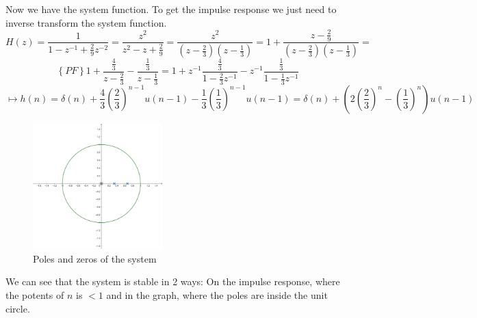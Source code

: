 \documentclass{article}
\begin{document}
\begin{enumerate}
\begin{enumerate}
                Now we have the system function. To get the impulse response we just need to inverse transform the system function.
                $$
                    H(z) = \frac{1}{1 - z^{-1} + \frac{2}{9}z^{-2}} = 
                    \frac{z^2}{z^2 - z + \frac{2}{9}} = 
                    \frac{z^2}{ (z-\frac{2}{3}) (z-\frac{1}{3}) } = 
                    1 + \frac{z-\frac{2}{9}}{ (z-\frac{2}{3}) (z-\frac{1}{3}) } =
                $$ $$
                    \left\{ PF \right\} 
                    1 + \frac{\frac{4}{3}}{z-\frac{2}{3}} - \frac{\frac{1}{3}}{z-\frac{1}{3}} = 
                    1 + z^{-1}\frac{\frac{4}{3}}{1-\frac{2}{3}z^{-1}}
                    - z^{-1}\frac{\frac{1}{3}}{1-\frac{1}{3}z^{-1}} 
                $$ $$
                    \longmapsto h(n) = \delta(n) + \frac{4}{3} \left( \frac{2}{3} \right)^{n-1}u(n-1)
                    - \frac{1}{3}\left( \frac{1}{3}\right)^{n-1}u(n-1) 
                    = \delta(n) + \left( 2 \left( \frac{2}{3} \right)^n
                    - \left( \frac{1}{3} \right)^n \right) u(n-1)
                $$
               	\begin{figure}[h]
               		\centering
               		\includegraphics[width=5.0cm]{geogebra-export.png}
               		\caption{Poles and zeros of the system}
               		\label{fig:plot1}
               	\end{figure}

                We can see that the system is stable in 2 ways: On the impulse
response, where the potents of $n$ is $<1$ and in the graph, where the poles
are inside the unit circle.
                
                
                

\end{enumerate}
\end{enumerate}
\end{document}
